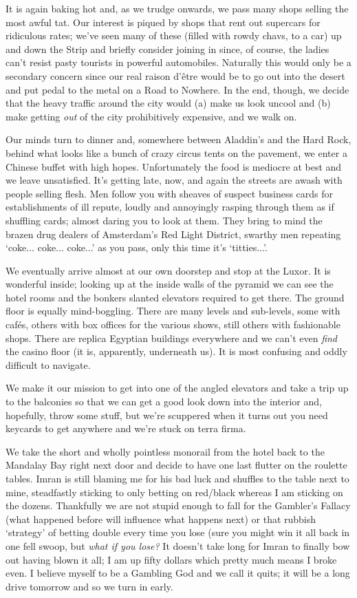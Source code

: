 \documentclass[a5paper,titlepage,11pt,draft]{book}
\begin{document}
It is again baking hot and, as we trudge onwards, we pass many shops selling the most awful tat.  Our interest is piqued by shops that rent out supercars for ridiculous rates; we've seen many of these (filled with rowdy chavs, to a car) up and down the Strip and briefly consider joining in since, of course, the ladies can't resist pasty tourists in powerful automobiles.  Naturally this would only be a secondary concern since our real raison d'\^{e}tre would be to go out into the desert and put pedal to the metal on a Road to Nowhere.  In the end, though, we decide that the heavy traffic around the city would (a) make us look uncool and (b) make getting \emph{out} of the city prohibitively expensive, and we walk on.

Our minds turn to dinner and, somewhere between Aladdin's and the Hard Rock, behind what looks like a bunch of crazy circus tents on the pavement, we enter a Chinese buffet with high hopes.  Unfortunately the food is mediocre at best and we leave unsatisfied.  It's getting late, now, and again the streets are awash with people selling flesh.  Men follow you with sheaves of suspect business cards for establishments of ill repute, loudly and annoyingly rasping through them as if shuffling cards; almost daring you to look at them.  They bring to mind the brazen drug dealers of Amsterdam's Red Light District, swarthy men repeating `coke... coke... coke...' as you pass, only this time it's `titties...'.

We eventually arrive almost at our own doorstep and stop at the Luxor.  It is wonderful inside; looking up at the inside walls of the pyramid we can see the hotel rooms and the bonkers slanted elevators required to get there.  The ground floor is equally mind-boggling.  There are many levels and sub-levels, some with caf\'{e}s, others with box offices for the various shows, still others with fashionable shops.  There are replica Egyptian buildings everywhere and we can't even \emph{find} the casino floor (it is, apparently, underneath us).  It is most confusing and oddly difficult to navigate.

We make it our mission to get into one of the angled elevators and take a trip up to the balconies so that we can get a good look down into the interior and, hopefully, throw some stuff, but we're scuppered when it turns out you need keycards to get anywhere and we're stuck on terra firma.

We take the short and wholly pointless monorail from the hotel back to the Mandalay Bay right next door and decide to have one last flutter on the roulette tables.  Imran is still blaming me for his bad luck and shuffles to the table next to mine, steadfastly sticking to only betting on red/black whereas I am sticking on the dozens.  Thankfully we are not stupid enough to fall for the Gambler's Fallacy (what happened before will influence what happens next) or that rubbish `strategy' of betting double every time you lose (sure you might win it all back in one fell swoop, but \emph{what if you lose?}  It doesn't take long for Imran to finally bow out having blown it all; I am up fifty dollars which pretty much means I broke even.  I believe myself to be a Gambling God and we call it quits; it will be a long drive tomorrow and so we turn in early.
\end{document}
